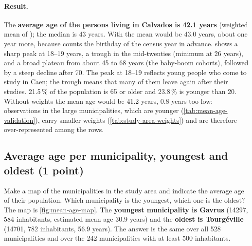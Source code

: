 \paragraph{Result.}
The \textbf{average age of the persons living in Calvados is 42.1 years} (weighted mean of ); the median is
43 years. With  the mean would be 43.0 years, about one year more, because  counts the birthday of
the census year in advance.  shows a sharp peak at 18--19 years, a trough in the mid-twenties
(minimum at 26 years), and a broad plateau from about 45 to 68 years (the baby-boom cohorts), followed by a steep
decline after 70. The peak at 18--19 reflects young people who come to study in Caen; the trough means that many of
them leave again after their studies. 21.5\,\% of the population is 65 or older and 23.8\,\% is younger than 20.
Without weights the mean age would be 41.2 years, 0.8 years too low: observations in the large municipalities, which
are younger (\cref{tab:mean-age-validation}), carry smaller weights (\cref{tab:study-area-weights}) and are therefore
over-represented among the rows.

\subsection{Average age per municipality, youngest and oldest (1 point)}

\begin{qa}{Make a map of the municipalities in the study area and indicate the average age of their population. Which
municipality is the youngest, which one is the oldest?}
The map is \cref{fig:mean-age-map}. The \textbf{youngest municipality is Gavrus} (14297, 584 inhabitants, estimated
mean age 30.9 years) and the \textbf{oldest is Tourg\'eville} (14701, 782 inhabitants, 56.9 years). The answer is the
same over all 528 municipalities and over the 242 municipalities with at least 500 inhabitants.
\end{qa}

